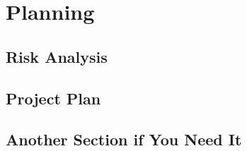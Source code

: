\chapter{Planning}

\section{Risk Analysis}


\section{Project Plan}


\section{Another Section if You Need It}


